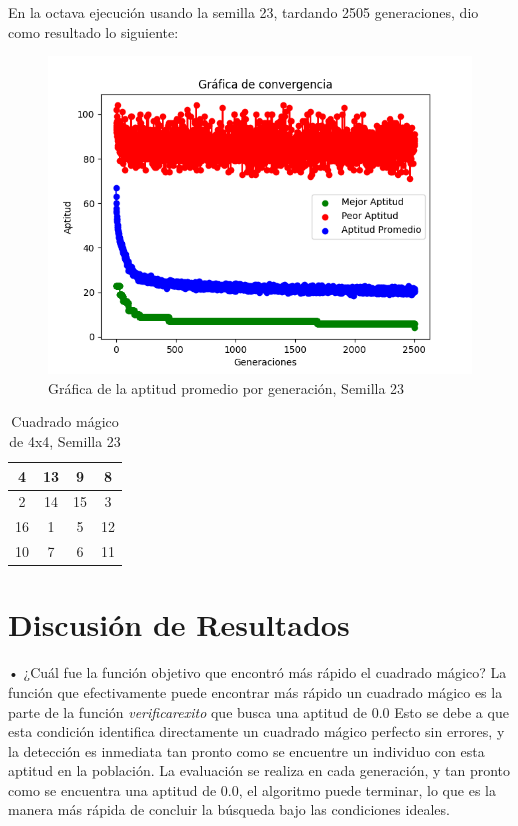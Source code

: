 \documentclass{report}
\begin{document}
    En la octava ejecución usando la semilla 23, tardando 2505 generaciones, dio como resultado lo siguiente:
    \begin{figure}[H]
        \centering
        \includegraphics[scale=0.5]{Grafica8_2.png}
        \caption{Gráfica de la aptitud promedio por generación, Semilla 23}
    \end{figure}
    \begin{table}[H]
        \centering
        \begin{tabular}{|c|c|c|c|}
            \hline
            4 & 13 & 9 & 8\\
            \hline
            2 & 14 & 15 & 3\\
            \hline
            16 & 1 & 5 & 12\\
            \hline
            10 & 7 & 6 & 11\\
            \hline
        \end{tabular}
        \caption{Cuadrado mágico de 4x4, Semilla 23}
    \end{table}
    
    \section{Discusión de Resultados}
    •  ¿Cuál fue la función objetivo que encontró más rápido el cuadrado mágico?
    La función que efectivamente puede encontrar más rápido un cuadrado mágico es la parte 
    de la función \textit{verificarexito} que busca una aptitud de 0.0
    Esto se debe a que esta condición identifica directamente un cuadrado mágico perfecto sin errores, y la detección es inmediata 
    tan pronto como se encuentre un individuo con esta aptitud en la población. La evaluación se realiza en cada generación, 
    y tan pronto como se encuentra una aptitud de 0.0, el algoritmo puede terminar, lo que es la manera más rápida de concluir 
    la búsqueda bajo las condiciones ideales.
\end{document}
